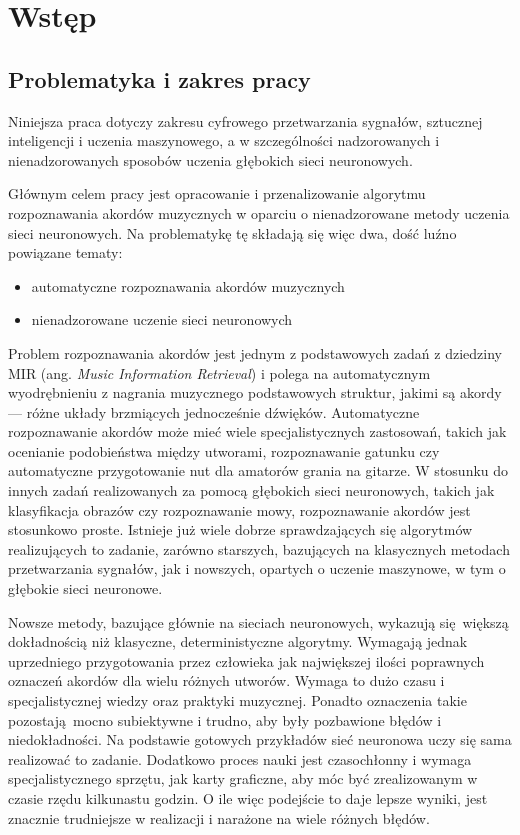 \chapter{Wstęp} \label{chapter:introduction}



\section{Problematyka i zakres pracy}

Niniejsza praca dotyczy zakresu cyfrowego przetwarzania sygnałów, sztucznej inteligencji i uczenia maszynowego, a w szczególności nadzorowanych i nienadzorowanych sposobów uczenia głębokich sieci neuronowych.

Głównym celem pracy jest opracowanie i przenalizowanie algorytmu rozpoznawania akordów muzycznych w oparciu o nienadzorowane metody uczenia sieci neuronowych. Na problematykę tę składają się więc dwa, dość luźno powiązane tematy:
\begin{itemize}
    \item automatyczne rozpoznawania akordów muzycznych
    \item nienadzorowane uczenie sieci neuronowych
\end{itemize}

Problem rozpoznawania akordów jest jednym z podstawowych zadań z dziedziny MIR (ang. \emph{Music Information Retrieval}) i polega na automatycznym wyodrębnieniu z nagrania muzycznego podstawowych struktur, jakimi są akordy --- różne układy brzmiących jednocześnie dźwięków. Automatyczne rozpoznawanie akordów może mieć wiele specjalistycznych zastosowań, takich jak ocenianie podobieństwa między utworami, rozpoznawanie gatunku czy automatyczne przygotowanie nut dla amatorów grania na gitarze. W stosunku do innych zadań realizowanych za pomocą głębokich sieci neuronowych, takich jak klasyfikacja obrazów czy rozpoznawanie mowy, rozpoznawanie akordów jest stosunkowo proste. Istnieje już wiele dobrze sprawdzających się algorytmów realizujących to zadanie, zarówno starszych, bazujących na klasycznych metodach przetwarzania sygnałów, jak i nowszych, opartych o uczenie maszynowe, w tym o głębokie sieci neuronowe. 

Nowsze metody, bazujące głównie na sieciach neuronowych, wykazują się większą dokładnością niż klasyczne, deterministyczne algorytmy. Wymagają jednak uprzedniego przygotowania przez człowieka jak największej ilości poprawnych oznaczeń akordów dla wielu różnych utworów. Wymaga to dużo czasu i specjalistycznej wiedzy oraz praktyki muzycznej. Ponadto oznaczenia takie pozostają mocno subiektywne i trudno, aby były pozbawione błędów i niedokładności.  Na podstawie gotowych przykładów sieć neuronowa uczy się sama realizować to zadanie. Dodatkowo proces nauki jest czasochłonny i wymaga specjalistycznego sprzętu, jak karty graficzne, aby móc być zrealizowanym w czasie rzędu kilkunastu godzin. O ile więc podejście to daje lepsze wyniki, jest znacznie trudniejsze w realizacji i narażone na wiele różnych błędów.

